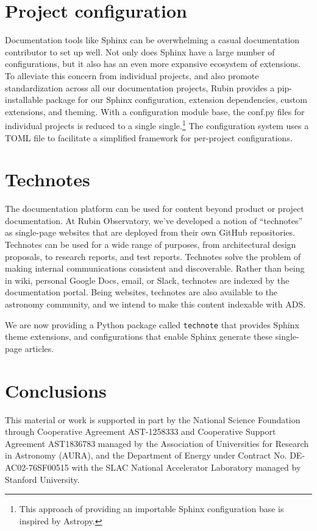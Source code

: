 \documentclass[11pt,twoside]{article}
\begin{document}
\section{Project configuration}

Documentation tools like Sphinx can be overwhelming a casual documentation contributor to set up well.
Not only does Sphinx have a large number of configurations, but it also has an even more expansive ecosystem of extensions.
To alleviate this concern from individual projects, and also promote standardization across all our documentation projects, Rubin provides a pip-installable package for our Sphinx configuration, extension dependencies, custom extensions, and theming.
With a configuration module base, the conf.py files for individual projects is reduced to a single single.\footnote{This approach of providing an importable Sphinx configuration base is inspired by Astropy.}
The configuration system uses a TOML file to facilitate a simplified framework for per-project configurations.


\section{Technotes}

The documentation platform can be used for content beyond product or project documentation.
At Rubin Observatory, we've developed a notion of ``technotes'' as single-page websites that are deployed from their own GitHub repositories.
Technotes can be used for a wide range of purposes, from architectural design proposals, to research reports, and test reports.
Technotes solve the problem of making internal communications consistent and discoverable.
Rather than being in wiki, personal Google Docs, email, or Slack, technotes are indexed by the documentation portal.
Being websites, technotes are also available to the astronomy community, and we intend to make this content indexable with ADS.

We are now providing a Python package called \texttt{technote} that provides Sphinx theme extensions, and configurations that enable Sphinx generate these single-page articles.

\section{Conclusions}


\acknowledgements This material or work is supported in part by the National Science Foundation through Cooperative Agreement AST-1258333 and Cooperative Support Agreement AST1836783 managed by the Association of Universities for Research in Astronomy (AURA), and the Department of Energy under Contract No. DE-AC02-76SF00515 with the SLAC National Accelerator Laboratory managed by Stanford University.



\end{document}
